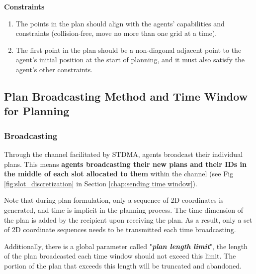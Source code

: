 \textbf{Constraints}

\begin{enumerate}
    \item The points in the plan should align with the agents' capabilities and constraints (collision-free, move no more than one grid at a time).
    \item The first point in the plan should be a non-diagonal adjacent point to the agent's initial position at the start of planning, and it must also satisfy the agent's other constraints.
\end{enumerate}



\subsection{Plan Broadcasting Method and Time Window for Planning}

\subsubsection{Broadcasting}

Through the channel facilitated by STDMA, agents broadcast their individual plans. 
This means \textbf{agents broadcasting their new plans and their IDs in the middle of each slot allocated to them} within the channel (see Fig \ref{fig:slot_discretization} in Section \ref{chap:sending time window}).

Note that during plan formulation, only a sequence of 2D coordinates is generated, and time is implicit in the planning process. The time dimension of the plan is added by the recipient upon receiving the plan.
As a result, only a set of 2D coordinate sequences needs to be transmitted each time broadcasting.

Additionally, there is a global parameter called "\textbf{\textit{plan length limit}}", the length of the plan broadcasted each time window should not exceed this limit. 
The portion of the plan that exceeds this length will be truncated and abandoned.


